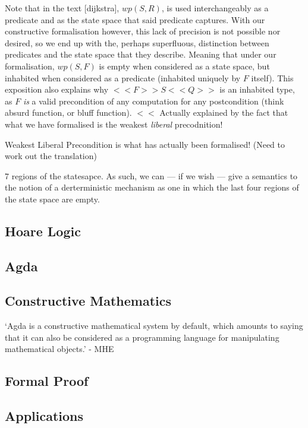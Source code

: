 \documentclass[oneside,12pt]{article}
\begin{document}
Note that in the text [dijkstra], $wp(S,R)$, is used interchangeably as a predicate and as the state space that said predicate captures. With our constructive formalisation however, this lack of precision is not possible nor desired, so we end up with the, perhaps superfluous, distinction between predicates and the state space that they describe. Meaning that under our formalisation, $wp(S,F)$ is empty when considered as a state space, but inhabited when considered as a predicate (inhabited uniquely by $F$ itself). This exposition also explains why $<<F>> S <<Q>>$ is an inhabited type, as $F$ \emph{is} a valid precondition of any computation for any postcondition (think absurd function, or bluff function). $<<$ Actually explained by the fact that what we have formalised is the weakest \emph{liberal} precodnition!


Weakest Liberal Precondition is what has actually been formalised! (Need to work out the translation)


7 regions of the statesapce. As such, we can --- if we wish --- give a semantics to the notion of a derterministic mechanism as one in which the last four regions of the state space are empty.

\subsection{Hoare Logic}


\subsection{Agda}

\subsection{Constructive Mathematics}

`Agda is a constructive mathematical system by default, which amounts to saying that it can also be considered as a
programming language for manipulating mathematical objects.' - MHE



\subsection{Formal Proof}

\subsection{Applications}
\end{document}
